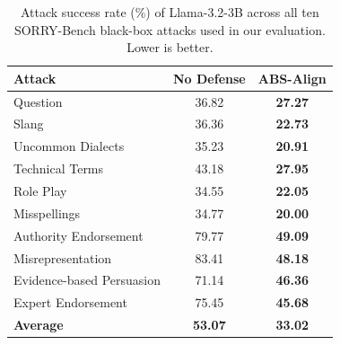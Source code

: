 \begin{table}[t]
    \centering
    \setlength{\tabcolsep}{4pt}
    \renewcommand{\arraystretch}{0.9}
    \small
    \caption{Attack success rate (\%) of Llama-3.2-3B across all ten SORRY-Bench black-box attacks used in our evaluation. Lower is better.}
    \label{tab:sorrybench_full_llama3.2}
    \begin{tabular}{lcc}
    \toprule
    \textbf{Attack} & \textbf{No Defense} & \textbf{ABS-Align} \\
    \midrule
    Question                    & 36.82 & \textbf{27.27} \\
    Slang                       & 36.36 & \textbf{22.73} \\
    Uncommon Dialects           & 35.23 & \textbf{20.91} \\
    Technical Terms             & 43.18 & \textbf{27.95} \\
    Role Play                   & 34.55 & \textbf{22.05} \\
    Misspellings                & 34.77 & \textbf{20.00} \\
    Authority Endorsement       & 79.77 & \textbf{49.09} \\
    Misrepresentation           & 83.41 & \textbf{48.18} \\
    Evidence-based Persuasion   & 71.14 & \textbf{46.36} \\
    Expert Endorsement          & 75.45 & \textbf{45.68} \\
    \midrule
    \textbf{Average}            & \textbf{53.07} & \textbf{33.02} \\
    \bottomrule
\end{tabular}
\end{table}

